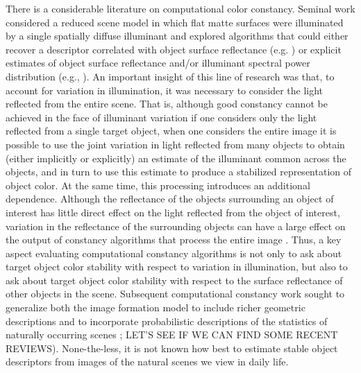 \documentclass{jov}
\begin{document}
There is a considerable literature on computational color constancy. Seminal work considered a reduced scene model in which flat matte surfaces were illuminated by a single spatially diffuse illuminant and explored algorithms that could either recover a descriptor correlated with object surface reflectance (e.g. ) or explicit estimates of object surface reflectance and/or illuminant spectral power distribution (e.g., ).
An important insight of this line of research was that, to account for variation in illumination, it was necessary to consider the light reflected from the entire scene. That is, although good constancy cannot be achieved in the face of illuminant variation if one considers only the light reflected from a single target object, when one considers the entire image it is possible to use the joint variation in light reflected from many objects to obtain (either implicitly or explicitly) an estimate of the illuminant common across the objects, and in turn to use this estimate to produce a stabilized representation of object color.
At the same time, this processing introduces an additional dependence.  Although the reflectance of the objects surrounding an object of interest has little direct effect on the light reflected from the object of interest, variation in the reflectance of the surrounding objects can have a large effect on the output of constancy algorithms that process the entire image \cite{BrainardWandellRetinex}.
Thus, a key aspect evaluating computational constancy algorithms is not only to ask about target object color stability with respect to variation in illumination, but also to ask about target object color stability with respect to the surface reflectance of other objects in the scene.
Subsequent computational constancy work sought to generalize both the image formation model to include richer geometric descriptions and to incorporate probabilistic descriptions of the statistics of naturally occurring scenes \cite{funt1988color, D'ZmuraConstancy3, barron2012color, D'ZmuraIversonSinger,BrainardFreeman}; LET'S SEE IF WE CAN FIND SOME RECENT REVIEWS).  None-the-less, it is not known how best to estimate stable object descriptors from images of the natural scenes we view in daily life.
\end{document}
